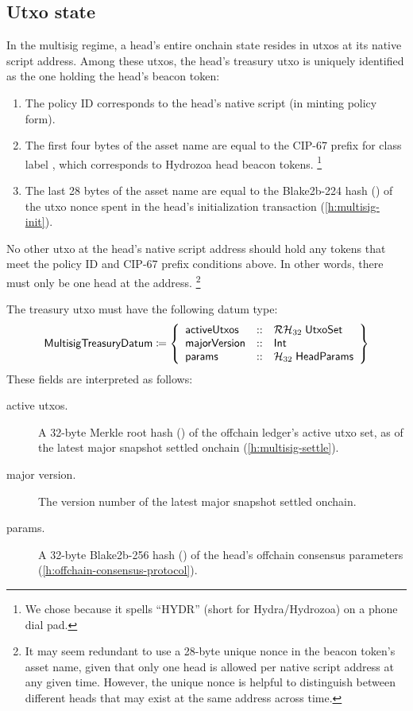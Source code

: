 \documentclass[../hydrozoa.tex]{subfiles}
\begin{document}
\subsection{Utxo state}%
\label{h:multisig-utxo-state}%
In the multisig regime, a head's entire onchain state resides in utxos at its native script address.
Among these utxos, the head's treasury utxo is uniquely identified as the one holding the head's beacon token:
\begin{enumerate}
  \item The policy ID corresponds to the head's native script (in minting policy form).
  \item The first four bytes of the asset name are equal to the CIP-67
    \citep{AlessandroKonradThomasVellekoopCIP67AssetName2022}
    prefix for class label \inlineColored{\headBeaconTokenNum}, which corresponds to Hydrozoa head beacon tokens.%
    \footnote{We chose \inlineColored{\headBeaconTokenNum} because it spells ``HYDR'' (short for Hydra/Hydrozoa) on a phone dial pad.}
  \item The last 28 bytes of the asset name are equal to the Blake2b-224 hash () of the utxo nonce spent in the head's initialization transaction (\cref{h:multisig-init}).
\end{enumerate}
No other utxo at the head's native script address should hold any tokens that meet the policy ID and CIP-67 prefix conditions above. In other words, there must only be one head at the address.%
\footnote{It may seem redundant to use a 28-byte unique nonce in the beacon token's asset name, given that only one head is allowed per native script address at any given time.
  However, the unique nonce is helpful to distinguish between different heads that may exist at the same address across time.}

The treasury utxo must have the following datum type:
\begin{equation*}
  \mathsf{MultisigTreasuryDatum} \coloneq \left\{
    \begin{array}{lll}
      \mathsf{activeUtxos}  &::& \mathcal{RH}_{32} \; \mathsf{UtxoSet} \\
      \mathsf{majorVersion} &::& \mathsf{Int} \\
      \mathsf{params} &::& \mathcal{H}_{32} \; \mathsf{HeadParams}
    \end{array}\right\}
\end{equation*}
These fields are interpreted as follows:
\begin{description}
  \item[active utxos.] A 32-byte Merkle root hash () of the offchain ledger's active utxo set, as of the latest major snapshot settled onchain (\cref{h:multisig-settle}).
  \item[major version.] The version number of the latest major snapshot settled onchain.
  \item[params.] A 32-byte Blake2b-256 hash () of the head's offchain consensus parameters (\cref{h:offchain-consensus-protocol}).
\end{description}
\end{document}
